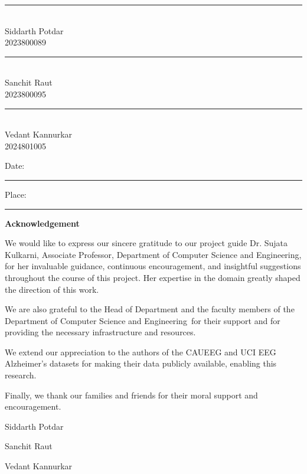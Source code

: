 \documentclass[11pt,a4paper]{article}
\newcommand{\StudentA}{Siddarth Potdar}
\newcommand{\StudentARoll}{2023800089}
\newcommand{\StudentB}{Sanchit Raut}
\newcommand{\StudentBRoll}{2023800095}
\newcommand{\StudentC}{Vedant Kannurkar}
\newcommand{\StudentCRoll}{2024801005}
\newcommand{\GuideName}{Dr. Sujata Kulkarni}
\newcommand{\GuideRank}{Associate Professor}
\newcommand{\DeptName}{Department of Computer Science and Engineering}
\begin{document}
\vspace{26mm}
\noindent
\begin{minipage}[t]{0.32\linewidth}\centering
\rule{38mm}{0.4pt}\\[2mm]\StudentA\\ \StudentARoll
\end{minipage}\hfill
\begin{minipage}[t]{0.32\linewidth}\centering
\rule{38mm}{0.4pt}\\[2mm]\StudentB\\ \StudentBRoll
\end{minipage}\hfill
\begin{minipage}[t]{0.32\linewidth}\centering
\rule{38mm}{0.4pt}\\[2mm]\StudentC\\ \StudentCRoll
\end{minipage}

\vspace{24mm}
\noindent Date: \rule{40mm}{0.4pt} \hfill Place: \rule{40mm}{0.4pt}

\clearpage\thispagestyle{empty}
\begin{center}{\Large\bfseries Acknowledgement\par}\end{center}
\vspace{10mm}

We would like to express our sincere gratitude to our project guide
\GuideName, \GuideRank, \DeptName, for her invaluable guidance, continuous
encouragement, and insightful suggestions throughout the course of this project.
Her expertise in the domain greatly shaped the direction of this work.

We are also grateful to the Head of Department and the faculty members of the
\DeptName\ for their support and for providing the necessary infrastructure and
resources.

We extend our appreciation to the authors of the CAUEEG and UCI EEG Alzheimer's
datasets for making their data publicly available, enabling this research.

Finally, we thank our families and friends for their moral support and
encouragement.

\vspace{26mm}
\noindent
\begin{minipage}[t]{0.32\linewidth}\centering \StudentA \end{minipage}\hfill
\begin{minipage}[t]{0.32\linewidth}\centering \StudentB \end{minipage}\hfill
\begin{minipage}[t]{0.32\linewidth}\centering \StudentC \end{minipage}
\end{document}
